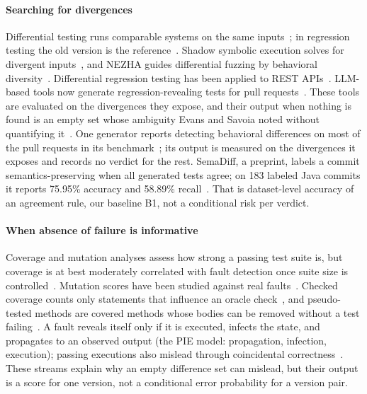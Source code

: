 \documentclass{ieeeaccess}
\begin{document}
\paragraph*{Searching for divergences} Differential testing runs comparable systems on the same inputs~\cite{mckeeman1998differential}; in regression testing the old version is the reference~\cite{evans2007differential}. Shadow symbolic execution solves for divergent inputs~\cite{cadar2014shadow,palikareva2016shadow}, and NEZHA guides differential fuzzing by behavioral diversity~\cite{petsios2017nezha}. Differential regression testing has been applied to REST APIs~\cite{godefroid2020differential}. LLM-based tools now generate regression-revealing tests for pull requests~\cite{pradel2026testora,hu2026difftestgen,lecong2026patchguru,fu2026orion}. These tools are evaluated on the divergences they expose, and their output when nothing is found is an empty set whose ambiguity Evans and Savoia noted without quantifying it~\cite{evans2007differential}. One generator reports detecting behavioral differences on most of the pull requests in its benchmark~\cite{hu2026difftestgen}; its output is measured on the divergences it exposes and records no verdict for the rest. SemaDiff, a preprint, labels a commit semantics-preserving when all generated tests agree; on 183 labeled Java commits it reports 75.95\% accuracy and 58.89\% recall~\cite{ayub2026semadiff}. That is dataset-level accuracy of an agreement rule, our baseline B1, not a conditional risk per verdict.

\paragraph*{When absence of failure is informative} Coverage and mutation analyses assess how strong a passing test suite is, but coverage is at best moderately correlated with fault detection once suite size is controlled~\cite{inozemtseva2014coverage,kochhar2015code}. Mutation scores have been studied against real faults~\cite{papadakis2018mutation}. Checked coverage counts only statements that influence an oracle check~\cite{schuler2011assessing}, and pseudo-tested methods are covered methods whose bodies can be removed without a test failing~\cite{niedermayr2016will,veraperez2019comprehensive}. A fault reveals itself only if it is executed, infects the state, and propagates to an observed output (the PIE model: propagation, infection, execution); passing executions also mislead through coincidental correctness~\cite{schuler2011assessing}. These streams explain why an empty difference set can mislead, but their output is a score for one version, not a conditional error probability for a version pair.
\end{document}
